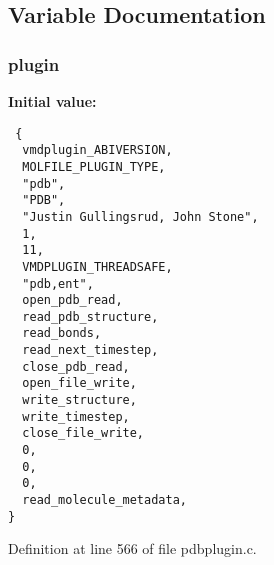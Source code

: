 \subsection{Variable Documentation}
\subsubsection{ plugin\hspace{0.3cm}{\tt  [static]}}\label{pdbplugin_8c_a1}


{\bf Initial value:}

\footnotesize\begin{verbatim} {
  vmdplugin_ABIVERSION,                     
  MOLFILE_PLUGIN_TYPE,                      
  "pdb",                                    
  "PDB",                                    
  "Justin Gullingsrud, John Stone",         
  1,                                        
  11,                                       
  VMDPLUGIN_THREADSAFE,                     
  "pdb,ent",                                
  open_pdb_read,
  read_pdb_structure,
  read_bonds,                               
  read_next_timestep,
  close_pdb_read,
  open_file_write,
  write_structure,
  write_timestep,
  close_file_write,
  0,
  0,
  0,
  read_molecule_metadata, 
}\end{verbatim}\normalsize 


Definition at line 566 of file pdbplugin.c.